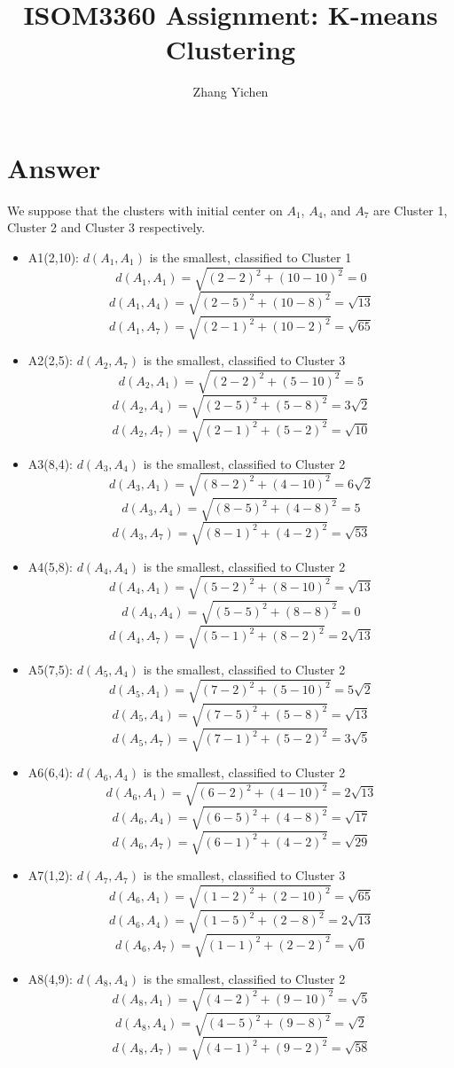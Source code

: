 \documentclass{article}
\title{ISOM3360 Assignment: K-means Clustering}
\author{Zhang Yichen}
\begin{document}
\maketitle

\section{Answer} 
We suppose that the clusters with initial center on $A_1$, $A_4$, and $A_7$ are Cluster 1, Cluster 2 and Cluster 3 respectively.

\begin{itemize}
    \item A1(2,10): $d(A_1,A_1)$ is the smallest, classified to Cluster 1
    \[d(A_1,A_1)=\sqrt{(2-2)^2+(10-10)^2}=0\]
    \[d(A_1,A_4)=\sqrt{(2-5)^2+(10-8)^2}=\sqrt{13}\]
    \[d(A_1,A_7)=\sqrt{(2-1)^2+(10-2)^2}=\sqrt{65}\]
    \item A2(2,5): $d(A_2,A_7)$ is the smallest, classified to Cluster 3
    \[d(A_2,A_1)=\sqrt{(2-2)^2+(5-10)^2}=5\]
    \[d(A_2,A_4)=\sqrt{(2-5)^2+(5-8)^2}=3\sqrt{2}\]
    \[d(A_2,A_7)=\sqrt{(2-1)^2+(5-2)^2}=\sqrt{10}\]
    \item A3(8,4): $d(A_3,A_4)$ is the smallest, classified to Cluster 2
    \[d(A_3,A_1)=\sqrt{(8-2)^2+(4-10)^2}=6\sqrt{2}\]
    \[d(A_3,A_4)=\sqrt{(8-5)^2+(4-8)^2}=5\]
    \[d(A_3,A_7)=\sqrt{(8-1)^2+(4-2)^2}=\sqrt{53}\]
    \item A4(5,8): $d(A_4,A_4)$ is the smallest, classified to Cluster 2
    \[d(A_4,A_1)=\sqrt{(5-2)^2+(8-10)^2}=\sqrt{13}\]
    \[d(A_4,A_4)=\sqrt{(5-5)^2+(8-8)^2}=0\]
    \[d(A_4,A_7)=\sqrt{(5-1)^2+(8-2)^2}=2\sqrt{13}\]
    \item A5(7,5): $d(A_5,A_4)$ is the smallest, classified to Cluster 2
    \[d(A_5,A_1)=\sqrt{(7-2)^2+(5-10)^2}=5\sqrt{2}\]
    \[d(A_5,A_4)=\sqrt{(7-5)^2+(5-8)^2}=\sqrt{13}\]
    \[d(A_5,A_7)=\sqrt{(7-1)^2+(5-2)^2}=3\sqrt{5}\]
    \item A6(6,4): $d(A_6,A_4)$ is the smallest, classified to Cluster 2
    \[d(A_6,A_1)=\sqrt{(6-2)^2+(4-10)^2}=2\sqrt{13}\]
    \[d(A_6,A_4)=\sqrt{(6-5)^2+(4-8)^2}=\sqrt{17}\]
    \[d(A_6,A_7)=\sqrt{(6-1)^2+(4-2)^2}=\sqrt{29}\]
    \item A7(1,2): $d(A_7,A_7)$ is the smallest, classified to Cluster 3
    \[d(A_6,A_1)=\sqrt{(1-2)^2+(2-10)^2}=\sqrt{65}\]
    \[d(A_6,A_4)=\sqrt{(1-5)^2+(2-8)^2}=2\sqrt{13}\]
    \[d(A_6,A_7)=\sqrt{(1-1)^2+(2-2)^2}=\sqrt{0}\]
    \item A8(4,9): $d(A_8,A_4)$ is the smallest, classified to Cluster 2
    \[d(A_8,A_1)=\sqrt{(4-2)^2+(9-10)^2}=\sqrt{5}\]
    \[d(A_8,A_4)=\sqrt{(4-5)^2+(9-8)^2}=\sqrt{2}\]
    \[d(A_8,A_7)=\sqrt{(4-1)^2+(9-2)^2}=\sqrt{58}\]
\end{itemize}
\end{document}
